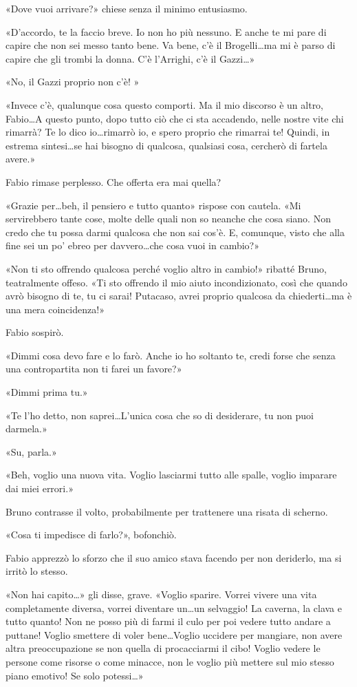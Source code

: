 «Dove vuoi arrivare?» chiese senza il minimo entusiasmo.

«D'accordo, te la faccio breve. Io non ho più nessuno. E anche te mi pare di capire che non sei messo tanto bene. Va bene, c'è il Brogelli\ldots ma mi è parso di capire che gli trombi la donna. C'è l'Arrighi, c'è il Gazzi\ldots»

«No, il Gazzi proprio non c'è! »

«Invece c'è, qualunque cosa questo comporti. Ma il mio discorso è un altro, Fabio\ldots A questo punto, dopo tutto ciò che ci sta accadendo, nelle nostre vite chi rimarrà? Te lo dico io\ldots rimarrò io, e spero proprio che rimarrai te! Quindi, in estrema sintesi\ldots se hai bisogno di qualcosa, qualsiasi cosa, cercherò di fartela avere.»

Fabio rimase perplesso. Che offerta era mai quella?

«Grazie per\ldots beh, il pensiero e tutto quanto» rispose con cautela. «Mi servirebbero tante cose, molte delle quali non so neanche che cosa siano. Non credo che tu possa darmi qualcosa che non sai cos'è. E, comunque, visto che alla fine sei un po' ebreo per davvero\ldots che cosa vuoi in cambio?»

«Non ti sto offrendo qualcosa perché voglio altro in cambio!» ribatté Bruno, teatralmente offeso. «Ti sto offrendo il mio aiuto incondizionato, così che quando avrò bisogno di te, tu ci sarai! Putacaso, avrei proprio qualcosa da chiederti\ldots ma è una mera coincidenza!»

Fabio sospirò.

«Dimmi cosa devo fare e lo farò. Anche io ho soltanto te, credi forse che senza una contropartita non ti farei un favore?»

«Dimmi prima tu.»

«Te l'ho detto, non saprei\ldots L'unica cosa che so di desiderare, tu non puoi darmela.»

«Su, parla.»

«Beh, voglio una nuova vita. Voglio lasciarmi tutto alle spalle, voglio imparare dai miei errori.»

Bruno contrasse il volto, probabilmente per trattenere una risata di scherno.

«Cosa ti impedisce di farlo?», bofonchiò.

Fabio apprezzò lo sforzo che il suo amico stava facendo per non deriderlo, ma si irritò lo stesso.

«Non hai capito\ldots» gli disse, grave. «Voglio sparire. Vorrei vivere una vita completamente diversa, vorrei diventare un\ldots un selvaggio! La caverna, la clava e tutto quanto! Non ne posso più di farmi il culo per poi vedere tutto andare a puttane! Voglio smettere di voler bene\ldots Voglio uccidere per mangiare, non avere altra preoccupazione se non quella di procacciarmi il cibo! Voglio vedere le persone come risorse o come minacce, non le voglio più mettere sul mio stesso piano emotivo! Se solo potessi\ldots»

